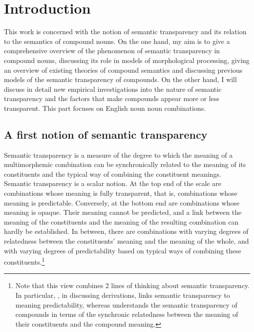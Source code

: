 \chapter{Introduction}
\label{cha:intro}
This work is concerned with the notion of semantic transparency and
its relation to the semantics of compound nouns. On the one hand, my
aim is to give a comprehensive overview of the phenomenon of semantic
transparency in compound nouns, discussing its role in models of
morphological processing, giving an overview of existing theories of
compound semantics and discussing previous models of the semantic
transparency of compounds.  On the other hand, I will discuss in
detail new empirical investigations into the nature of semantic
transparency and the factors that make compounds %
appear more or less transparent. This part focuses on English noun
noun combinations.

\section{A first notion of semantic transparency}

Semantic transparency is a measure of the degree to which the meaning
of a multimorphemic combination can be synchronically related to the meaning of its
constituents and the typical way of combining the constituent
meanings. Semantic transparency is a scalar notion. 
At the top
end of the scale are combinations whose meaning is fully transparent,
that is, combinations whose meaning is predictable. Conversely, at the bottom end are combinations whose
meaning is opaque. Their meaning cannot be predicted, and a link between
the meaning of the constituents and the meaning of the resulting combination can hardly be established.
 In between, there are
combinations with varying degrees of relatedness between the
constituents' meaning and the meaning of the whole, and with varying
degrees of predictability based on typical ways of combining these constituents.\footnote{Note that this  view combines 2 lines of thinking about
  semantic transparency. In particular, \citet[46]{Plag:2003}, in
  discussing derivations, links semantic
  transparency to meaning predictability, whereas
  \citet[344]{Zwitserlood:1994} understands the semantic transparency of
  compounds in terms of the synchronic relatedness between the meaning of their
  constituents and the compound meaning.}

